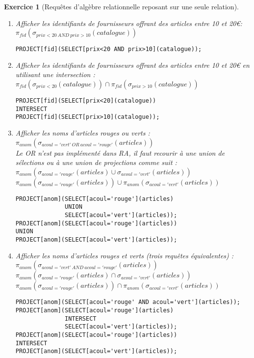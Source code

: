 \documentclass{article}
\theoremstyle{exostyle}
\newtheorem{exercice}{Exercice}
\newenvironment{questions}{

\begin{enumerate}[\hspace{12pt}\bfseries\itshape 1.]}{
\end{enumerate}

} %
\begin{document}
\begin{exercice}[Requêtes d'algèbre relationnelle reposant sur une seule relation]
\begin{questions}
\item Afficher les identifiants de fournisseurs offrant des articles entre 10 et 20\euro :\\
$\pi_{fid}(\sigma_{prix<20 \ AND\ prix>10}(catalogue))$
\begin{verbatim}
PROJECT[fid](SELECT[prix<20 AND prix>10](catalogue));
\end{verbatim}

\item Afficher les identifiants de fournisseurs offrant des articles entre 10 et 20\euro{} en utilisant une intersection :\\
$\pi_{fid}(\sigma_{prix<20}(catalogue)) \cap \pi_{fid}(\sigma_{prix>10}(catalogue))$
\begin{verbatim}
PROJECT[fid](SELECT[prix<20](catalogue))
INTERSECT
PROJECT[fid](SELECT[prix>10](catalogue));
\end{verbatim}

\item Afficher les noms d'articles rouges ou verts :\\
$\pi_{anom}(\sigma_{acoul='vert'\ OR\ acoul='rouge'}(articles))$\\
Le OR n'est pas implémenté dans RA, il faut recourir à une union de sélections ou à une union de projections comme suit :\\
$\pi_{anom}(\sigma_{acoul='rouge'}(articles) \cup \sigma_{acoul='vert'}(articles))$\\
$\pi_{anom}(\sigma_{acoul='rouge'}(articles)) \cup \pi_{anom}(\sigma_{acoul='vert'}(articles))$
\begin{verbatim}
PROJECT[anom](SELECT[acoul='rouge'](articles)
              UNION
              SELECT[acoul='vert'](articles));
PROJECT[anom](SELECT[acoul='rouge'](articles))
UNION
PROJECT[anom](SELECT[acoul='vert'](articles));
\end{verbatim}


\item Afficher les noms d'articles rouges et verts (trois requêtes équivalentes) :\\
$\pi_{anom}(\sigma_{acoul='vert'\ AND\ acoul='rouge'}(articles))$\\
$\pi_{anom}(\sigma_{acoul='rouge'}(articles) \cap \sigma_{acoul='vert'}(articles))$\\
$\pi_{anom}(\sigma_{acoul='rouge'}(articles)) \cap \pi_{anom}(\sigma_{acoul='vert'}(articles))$
\begin{verbatim}
PROJECT[anom](SELECT[acoul='rouge' AND acoul='vert'](articles));
PROJECT[anom](SELECT[acoul='rouge'](articles)
              INTERSECT
              SELECT[acoul='vert'](articles));
PROJECT[anom](SELECT[acoul='rouge'](articles))
INTERSECT
PROJECT[anom](SELECT[acoul='vert'](articles));
\end{verbatim}
\end{questions}

\end{exercice}
\end{document}
